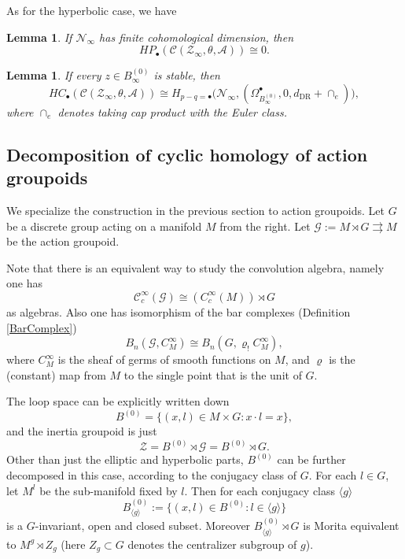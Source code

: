 \documentclass[a4paper]{amsart}
\newcommand{\DR}{\operatorname{DR}}
\newcommand{\maA}{\mathcal A}
\newcommand{\maC}{\mathcal C}
\newcommand{\maG}{\mathcal G}
\newcommand{\maN}{\mathcal N}
\newcommand{\maZ}{\mathcal Z}
\newcommand\<{\langle}
\renewcommand\>{\rangle}
\newtheorem{lem}[theorem]{Lemma}
\theoremstyle{definition}
\theoremstyle{remark}
\begin{document}
As for the hyperbolic case, we have
\begin{lem}
\cite[Corollary 4.7]{Crainic;EtaleGpoid}
\label{FiniteDim}
If $\maN _\infty$ has finite cohomological dimension, then
$$ H P _\bullet (\maC (\maZ _\infty , \theta , \maA)) \cong 0 .$$
\end{lem}

\begin{lem}
\cite[Proposition 4.6]{Crainic;EtaleGpoid}
If every $z \in B ^{(0)} _\infty $ is stable, then
$$ H C _\bullet (\maC (\maZ _\infty, \theta , \maA))
\cong H _{p-q=\bullet} \Big(\maN _\infty , (\Omega _{B ^{(0)}_\infty} ^\bullet , 0, d _{\DR} + \cap _e) \Big),$$
where $\cap _e$ denotes taking cap product with the Euler class.
\end{lem}

\subsection{Decomposition of cyclic homology of action groupoids}
We specialize the construction in the previous section to action groupoids.
Let $G$ be a discrete group acting on a manifold $M$ from the right.
Let $\maG := M \rtimes G \rightrightarrows M$ be the action groupoid.

Note that there is an equivalent way to study the convolution algebra, namely one has
$$ \maC^\infty_c (\maG) \cong (C^\infty _c (M)) \rtimes G $$
as algebras. Also one has isomorphism of the bar complexes (Definition \ref{BarComplex})
\begin{equation}
\label{ActionBar}
B _n (\maG , C^\infty _M) \cong B _n (G, \varrho _! C^\infty _M) ,
\end{equation}
where $C^\infty_M$ is the sheaf of germs of smooth functions on $M$,
and $\varrho$ is the (constant) map from $M$ to the single point that is the unit of $G$.

The loop space can be explicitly written down
\begin{equation}
\label{Loop}
B ^{(0)} = \{ (x, l) \in M \times G : x \cdot l = x \} ,
\end{equation}
and the inertia groupoid is just
$$ \maZ = B ^{(0)} \rtimes \maG = B ^{(0)} \rtimes G.$$
Other than just the elliptic and hyperbolic parts,
$B ^{(0)}$ can be further decomposed in this case, according to the conjugacy class of $G$.
For each $l \in G$, let $M^l$ be the sub-manifold fixed by $l$.
Then for each conjugacy class $\langle g \rangle $
\begin{equation}
B ^{(0)} _{\langle g \rangle} := \{ (x, l) \in B ^{(0)} : l \in \langle g \rangle \}
\end{equation}
is a $G$-invariant, open and closed subset.
Moreover $B^{(0)} _{\langle g \rangle} \rtimes G$ is Morita equivalent to $M^g \rtimes Z_g $
(here $Z _g \subset G$ denotes the centralizer subgroup of $g$).
\end{document}
